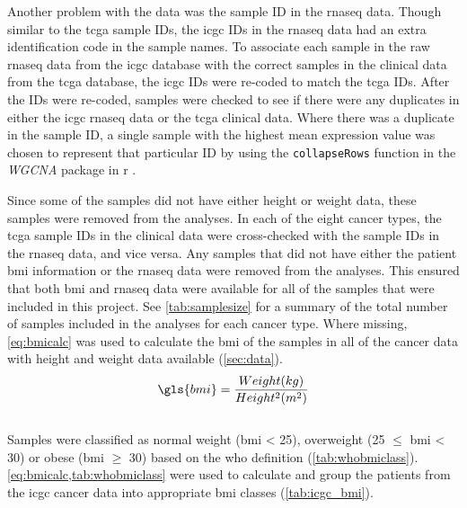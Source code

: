 Another problem with the data was the sample ID in the \gls{rnaseq} data.
Though similar to the \gls{tcga} sample IDs, the \gls{icgc} IDs in the \gls{rnaseq} data had an extra identification code in the sample names.
To associate each sample in the raw \gls{rnaseq} data from the \gls{icgc} database with the correct samples in the clinical data from the \gls{tcga} database, the \gls{icgc} IDs were re-coded to match the \gls{tcga} IDs.
After the IDs were re-coded, samples were checked to see if there were any duplicates in either the \gls{icgc} \gls{rnaseq} data or the \gls{tcga} clinical data.
Where there was a duplicate in the sample ID, a single sample with the highest mean expression value was chosen to represent that particular ID by using the \texttt{collapseRows} function in the \textit{WGCNA} package in \gls{r} \citep{Langfelder2008}.

Since some of the samples did not have either height or weight data, these samples were removed from the analyses.
In each of the eight cancer types, the \gls{tcga} sample IDs in the clinical data were cross-checked with the sample IDs in the \gls{rnaseq} data, and vice versa.
Any samples that did not have either the patient \gls{bmi} information or the \gls{rnaseq} data were removed from the analyses.
This ensured that both \gls{bmi} and \gls{rnaseq} data were available for all of the samples that were included in this project.
See \cref{tab:samplesize} for a summary of the total number of samples included in the analyses for each cancer type.
Where missing, \cref{eq:bmicalc} was used to calculate the \gls{bmi} of the samples in all of the cancer data with height and weight data available (\cref{sec:data}).
\\

\begin{equation}
	\label{eq:bmicalc}
	\gls{bmi} = \frac{Weight (kg)}{Height^2(m^2)}\\
\end{equation}
\\

\noindent
Samples were classified as normal weight (\gls{bmi} \textless{} 25), overweight (25 $\leq$ \gls{bmi} \textless{} 30) or obese (\gls{bmi} $\geq$ 30) based on the \gls{who} definition (\cref{tab:whobmiclass}).
\cref{eq:bmicalc,tab:whobmiclass} were used to calculate and group the patients from the \gls{icgc} cancer data into appropriate \gls{bmi} classes (\cref{tab:icgc_bmi}).

